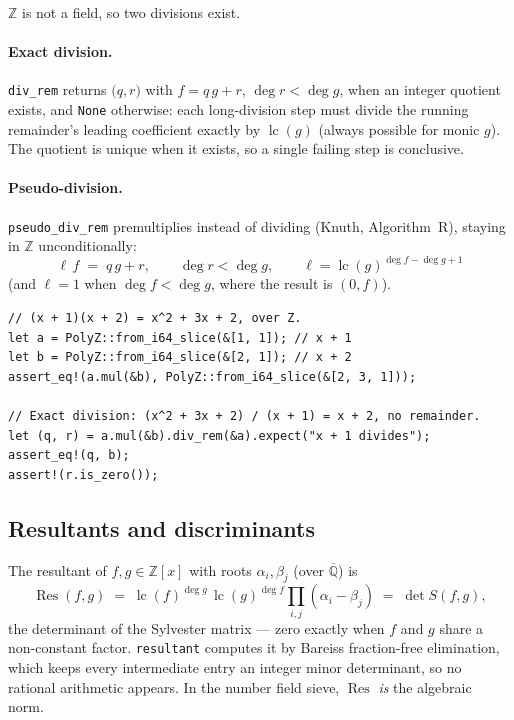 \documentclass[11pt]{article}
\newcommand{\code}[1]{\texttt{#1}}
\newcommand{\Z}{\mathbb{Z}}
\newcommand{\lc}{\operatorname{lc}}
\newcommand{\Res}{\operatorname{Res}}
\begin{document}
$\Z$ is not a field, so two divisions exist.

\paragraph{Exact division.} \code{div\_rem} returns
$\bigl(q, r\bigr)$ with $f = q\,g + r$, $\deg r < \deg g$, when an integer
quotient exists, and \code{None} otherwise: each long-division step must
divide the running remainder's leading coefficient exactly by $\lc(g)$
(always possible for monic $g$). The quotient is unique when it exists,
so a single failing step is conclusive.

\paragraph{Pseudo-division.} \code{pseudo\_div\_rem} premultiplies instead
of dividing (Knuth, Algorithm~R), staying in $\Z$ unconditionally:
\begin{equation}
\ell\, f \;=\; q\,g + r,
\qquad
\deg r < \deg g,
\qquad
\ell = \lc(g)^{\deg f - \deg g + 1}
\end{equation}
(and $\ell = 1$ when $\deg f < \deg g$, where the result is $(0, f)$).

\begin{lstlisting}
// (x + 1)(x + 2) = x^2 + 3x + 2, over Z.
let a = PolyZ::from_i64_slice(&[1, 1]); // x + 1
let b = PolyZ::from_i64_slice(&[2, 1]); // x + 2
assert_eq!(a.mul(&b), PolyZ::from_i64_slice(&[2, 3, 1]));

// Exact division: (x^2 + 3x + 2) / (x + 1) = x + 2, no remainder.
let (q, r) = a.mul(&b).div_rem(&a).expect("x + 1 divides");
assert_eq!(q, b);
assert!(r.is_zero());
\end{lstlisting}

\subsection{Resultants and discriminants}

The resultant of $f, g \in \Z[x]$ with roots $\alpha_i, \beta_j$ (over
$\overline{\mathbb{Q}}$) is
\begin{equation}
\Res(f, g)
\;=\; \lc(f)^{\deg g}\, \lc(g)^{\deg f} \prod_{i, j} (\alpha_i - \beta_j)
\;=\; \det S(f, g),
\end{equation}
the determinant of the Sylvester matrix --- zero exactly when $f$ and $g$
share a non-constant factor. \code{resultant} computes it by Bareiss
fraction-free elimination, which keeps every intermediate entry an integer
minor determinant, so no rational arithmetic appears. In the number field
sieve, $\Res$ \emph{is} the algebraic norm.
\end{document}
